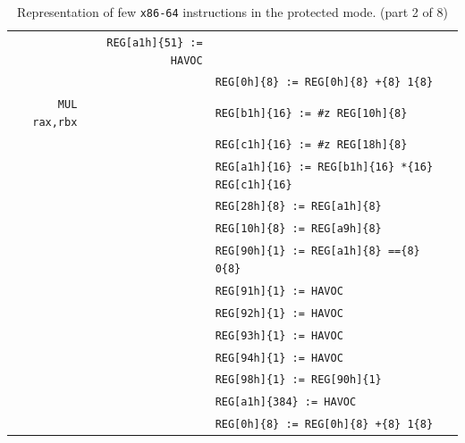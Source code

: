 \documentclass[10pt,twocolumn]{article}
\begin{document}
\begin{table}[!h]
\begin{center}
\begin{tabular}{r|rl}
& \texttt{REG[a1h]\{51\} := HAVOC} \\ &
& \texttt{REG[0h]\{8\} := REG[0h]\{8\} +\{8\} 1\{8\}} \\ \hline

\texttt{MUL rax,rbx} & %
& \texttt{REG[b1h]\{16\} := \#z REG[10h]\{8\}} \\ & %
& \texttt{REG[c1h]\{16\} := \#z REG[18h]\{8\}} \\ & %
& \texttt{REG[a1h]\{16\} := REG[b1h]\{16\} *\{16\} REG[c1h]\{16\}} \\ & %
& \texttt{REG[28h]\{8\} := REG[a1h]\{8\}} \\ & %
& \texttt{REG[10h]\{8\} := REG[a9h]\{8\}} \\ & %
& \texttt{REG[90h]\{1\} := REG[a1h]\{8\} ==\{8\} 0\{8\}} \\ & %
& \texttt{REG[91h]\{1\} := HAVOC} \\ & %
& \texttt{REG[92h]\{1\} := HAVOC} \\ & %
& \texttt{REG[93h]\{1\} := HAVOC} \\ & %
& \texttt{REG[94h]\{1\} := HAVOC} \\ & %
& \texttt{REG[98h]\{1\} := REG[90h]\{1\}} \\ & %
& \texttt{REG[a1h]\{384\} := HAVOC} \\ & %
& \texttt{REG[0h]\{8\} := REG[0h]\{8\} +\{8\} 1\{8\}} \\ \hline

\end{tabular}
\end{center}
\caption{Representation of few \texttt{x86-64} instructions in the
protected mode. (part 2 of 8)}
\end{table}

\clearpage
\end{document}
